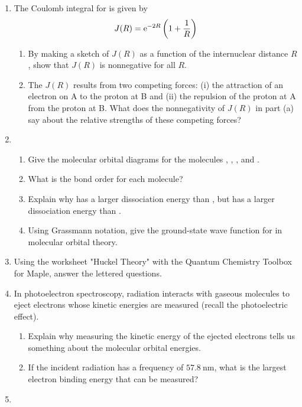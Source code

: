 \documentclass[../psets.tex]{subfiles}
\begin{document}
\begin{enumerate}
\begin{enumerate}
    \end{enumerate}
    \item The Coulomb integral for  is given by
    \begin{equation*}
        J(R) = \e[-2R]\left( 1+\frac{1}{R} \right)
    \end{equation*}
    \begin{enumerate}
        \item By making a sketch of $J(R)$ as a function of the internuclear distance $R$, show that $J(R)$ is nonnegative for all $R$.
        \item The $J(R)$ results from two competing forces: (i) the attraction of an electron on A to the proton at B and (ii) the repulsion of the proton at A from the proton at B. What does the nonnegativity of $J(R)$ in part (a) say about the relative strengths of these competing forces?
    \end{enumerate}
    \item 
    \begin{enumerate}
        \item Give the molecular orbital diagrams for the molecules , , , and .
        \item What is the bond order for each molecule?
        \item Explain why  has a larger dissociation energy than , but  has a larger dissociation energy than .
        \item Using Grassmann notation, give the ground-state wave function for  in molecular orbital theory.
    \end{enumerate}
    \item Using the worksheet "Huckel Theory" with the Quantum Chemistry Toolbox for Maple, answer the lettered questions.
    \item In photoelectron spectroscopy, radiation interacts with gaseous molecules to eject electrons whose kinetic energies are measured (recall the photoelectric effect).
    \begin{enumerate}
        \item Explain why measuring the kinetic energy of the ejected electrons tells us something about the molecular orbital energies.
        \item If the incident radiation has a frequency of $\SI{57.8}{\nano\meter}$, what is the largest electron binding energy that can be measured?
    \end{enumerate}
    \item 

\end{enumerate}
\end{document}
